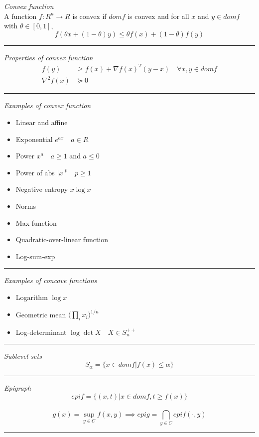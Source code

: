 \noindent
\textit{Convex function}\\
A function \(f : R^n \rightarrow R\) is convex if \(dom f\) is 
convex and for all \(x\) and \(y \in dom f\) with 
\(\theta \in [0,1]\),
\[ f(\theta x + (1-\theta)y) \le \theta f(x) + (1-\theta) f(y)\]
\rule{\linewidth}{0.1mm}

\noindent
\textit{Properties of convex function}
\begin{align*}
  f(y) &\ge f(x) + \nabla f(x)^T(y-x) \quad \forall x,y \in dom f\\
  \nabla^2f(x) &\succeq 0
\end{align*}
\rule{\linewidth}{0.1mm}

\noindent
\textit{Examples of convex function}
\begin{itemize}
\item Linear and affine
\item Exponential \(e^{ax} \quad a \in R\)
\item Power \(x^a \quad a \ge 1\) and \(a \le 0\)
\item Power of abs \(|x|^p \quad p \ge 1\)
\item Negative entropy \(x \log x\)
\item Norms
\item Max function
\item Quadratic-over-linear function
\item Log-sum-exp
\end{itemize}
\rule{\linewidth}{0.1mm}

\noindent
\textit{Examples of concave functions}
\begin{itemize}
\item Logarithm \(\log x\)
\item Geometric mean \( \bigg( \prod_i x_i \bigg) ^{1/n}\)
\item Log-determinant \(\log \det X \quad X \in S_n^{++}\)
\end{itemize}
\rule{\linewidth}{0.1mm}

\noindent
\textit{Sublevel sets}
\[S_\alpha = \{x \in dom f | f(x) \le \alpha\}\]
\rule{\linewidth}{0.1mm}

\noindent
\textit{Epigraph}
\[epi f = \{(x,t) | x \in dom f, t \ge f(x) \}\]\\
\[g(x) = \sup_{y \in C} f(x,y) \implies 
epi g = \bigcap_{y \in C} epi f(\cdot,y)\]
\rule{\linewidth}{0.1mm}

